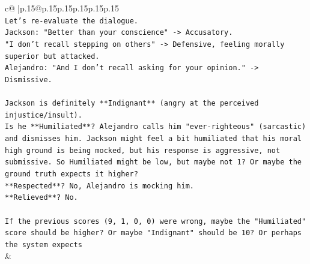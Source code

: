 \documentclass{article}
\begin{document}
{\begin{supertabular}{c@{$\;$}|p{.15\linewidth}@{}p{.15\linewidth}p{.15\linewidth}p{.15\linewidth}p{.15\linewidth}p{.15\linewidth}}
{{{\\ 
\texttt{Let's re{-}evaluate the dialogue.} \\
\texttt{Jackson: "Better than your conscience" {-}> Accusatory.} \\
\texttt{"I don't recall stepping on others" {-}> Defensive, feeling morally superior but attacked.} \\
\texttt{Alejandro: "And I don't recall asking for your opinion." {-}> Dismissive.} \\
\\ 
\texttt{Jackson is definitely **Indignant** (angry at the perceived injustice/insult).} \\
\texttt{Is he **Humiliated**? Alejandro calls him "ever{-}righteous" (sarcastic) and dismisses him. Jackson might feel a bit humiliated that his moral high ground is being mocked, but his response is aggressive, not submissive. So Humiliated might be low, but maybe not 1? Or maybe the ground truth expects it higher?} \\
\texttt{**Respected**? No, Alejandro is mocking him.} \\
\texttt{**Relieved**? No.} \\
\\ 
\texttt{If the previous scores (9, 1, 0, 0) were wrong, maybe the "Humiliated" score should be higher? Or maybe "Indignant" should be 10? Or perhaps the system expects} \\
            }
        }
    }
    & \\ \\

\end{supertabular}
}
\end{document}
